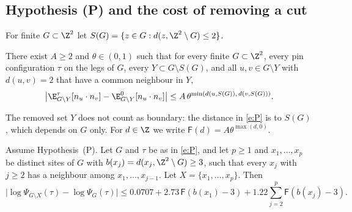 \subsection{Hypothesis (P) and the cost of removing a cut}\label{s:P}

For finite $G \subset \Z^2$ let $S(G) = \{ z \in G : d(z, \Z^2 \setminus G) \le 2 \}$.

\begin{hypothesis}[P]\label{h:P}
There exist $A \ge 2$ and $\theta \in (0, 1)$ such that for every finite $G \subset \Z^2$, every pin configuration $\tau$ on the legs of $G$, every $Y \subset G \setminus S(G)$, and all $u, v \in G \setminus Y$ with $d(u, v) = 2$ that have a common neighbour in $Y$,
\begin{equation}\label{e:P}
\bigl| \E^\tau_{G \setminus Y}[n_u \cdot n_v] - \E^0_{G \setminus Y}[n_u \cdot n_v] \bigr| \le A \, \theta^{\min(d(u, S(G)), \, d(v, S(G)))} .
\end{equation}
\end{hypothesis}

The removed set $Y$ does not count as boundary: the distance in \eqref{e:P} is to $S(G)$, which depends on $G$ only. For $d \in \Z$ we write $\mathsf F(d) = A \theta^{\max(d, 0)}$.

\begin{lemma}\label{l:removal}
Assume Hypothesis~(P). Let $G$ and $\tau$ be as in \eqref{e:P}, and let $p\ge1$ and $x_1,\dots,x_p$ be distinct sites of $G$ with $b(x_j) = d(x_j, \Z^2 \setminus G) \ge 3$, such that every $x_j$ with $j \ge 2$ has a neighbour among $x_1, \dots, x_{j - 1}$. Let $X = \{x_1, \dots, x_p\}$. Then
\begin{equation}\label{e:removal}
\bigl| \log \Psi_{G \setminus X}(\tau) - \log \Psi_G(\tau) \bigr| \le 0.0707 + 2.73 \, \mathsf F(b(x_1) - 3) + 1.22 \sum_{j = 2}^p \mathsf F(b(x_j) - 3) .
\end{equation}
\end{lemma}

